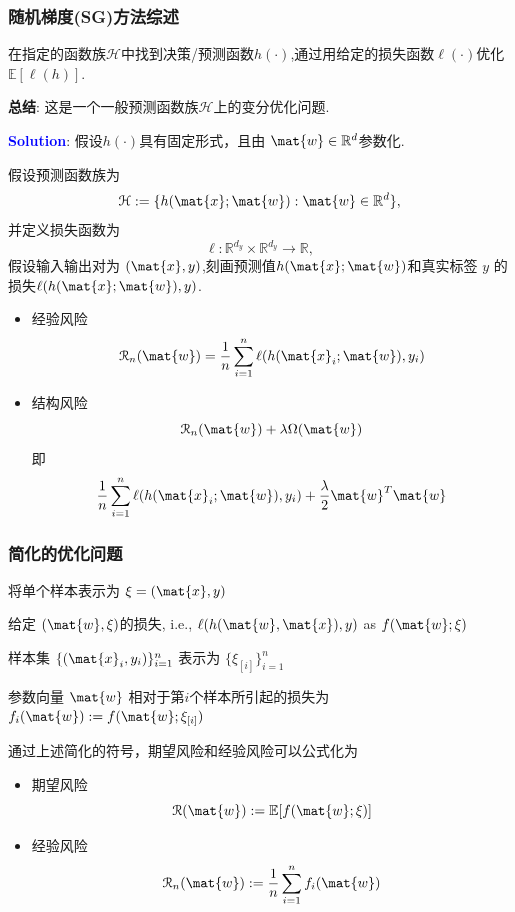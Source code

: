 \documentclass[handout]{beamer}
\begin{document}
\begin{frame}[allowframebreaks]
\frametitle{随机梯度(SG)方法综述}

{}

在指定的函数族$\mathcal{H}$中找到决策/预测函数$h(\cdot)$,通过用给定的损失函数$\ell(\cdot)$优化$\mathbb{E}[\ell(h)]$.

{\textcolor{dblue}{\textbf{总结}}:} 这是一个一般预测函数族$\mathcal{H}$上的变分优化问题.

{\textcolor{blue}{\textbf{Solution}}:} 假设$h(\cdot)$具有固定形式，且由 $\mat{w}\in\mathbb{R}^d$参数化.


假设预测函数族为
$$\mathcal{H} := \{h(\mat{x}; \mat{w}) : \mat{w} \in \mathbb{R}^d\},$$
并定义损失函数为 
$$\ell: \mathbb{R}^{d_y}\times \mathbb{R}^{d_y}\rightarrow \mathbb{R},$$  
假设输入输出对为 $(\mat{x}, y)$,刻画预测值$h(\mat{x}; \mat{w})$和真实标签 $y$ 的损失$\ell(h(\mat{x}; \mat{w}), y)$.

\framebreak

\begin{itemize}
  \item {\color{dblue}经验风险}
  $$\mathcal{R}_n(\mat{w})=\frac{1}{n}\sum\limits_{i=1}^{n}{\ell}
(h(\mat{x}_i;\mat{w}),y_i)$$
\item {\color{dblue}结构风险}
     $$\mathcal{R}_n(\mat{w})+\lambda \Omega(\mat{w})  $$
     即 $$\frac{1}{n}\sum\limits_{i=1}^{n}{\ell}(h(\mat{x}_i;\mat{w}),y_i)+\frac{\lambda}{2} \mat{w}^T\mat{w}$$
\end{itemize}
\end{frame}

\begin{frame}
\frametitle{简化的优化问题}

将单个样本表示为 $\xi = (\mat{x},y)$

给定 $(\mat{w},\xi)$的损失, i.e., $\ell(h(\mat{w},\mat{x}),y)$ as $f(\mat{w};\xi)$

样本集 $\{(\mat{x}_i,y_i)\}_{i=1}^n$ 表示为 $\{\xi_{[i]}\}_{i=1}^n$

参数向量 $\mat{w}$ 相对于第$i$个样本所引起的损失为
$f_i(\mat{w}):=f(\mat{w};\xi_{[i]})$

通过上述简化的符号，期望风险和经验风险可以公式化为
\begin{itemize}
\item {\color{dblue}期望风险}
$$\mathcal{R}(\mat{w}):=\mathbb{E}[f(\mat{w};\xi)]$$
\item {\color{dblue}经验风险}
$$\mathcal{R}_n(\mat{w}):=\frac{1}{n}\sum\limits_{i=1}^{n}f_i(\mat{w})$$
\end{itemize}
\end{frame}
\end{document}
